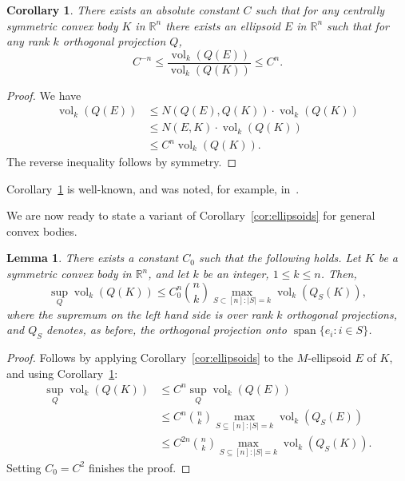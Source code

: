 \documentclass{article}
\newtheorem{lemma}{Lemma}
\newtheorem{corollary}[theorem]{Corollary}
\newcommand{\R}{{\mathbb{R}}}
\DeclareMathOperator{\vol}{vol}
\DeclareMathOperator{\lspan}{span}
\begin{document}
\begin{corollary}\label{cor:M-ellips}
  There exists an absolute constant $C$ such that for any centrally
  symmetric convex body $K$ in $\R^n$ there exists an ellipsoid $E$ in
  $\R^n$ such that for any rank $k$ orthogonal projection $Q$, 
  \[
  C^{-n} \le \frac{\vol_k(Q(E))}{\vol_k(Q(K))} \le C^n.
  \]
\end{corollary}
\begin{proof}
  We have
  \begin{align*}
    \vol_k(Q(E)) &\le N(Q(E), Q(K)) \cdot \vol_k(Q(K))\\
    &\le N(E, K) \cdot \vol_k(Q(K))\\
    &\le C^n \vol_k(Q(K)).
  \end{align*}
  The reverse inequality follows by symmetry. 
\end{proof}

Corollary~\ref{cor:M-ellips} is well-known, and was noted, for
example, in~\cite{MTJ03}.

We are now ready to state a variant of Corollary~\ref{cor:ellipsoids}
for general convex bodies. 

\begin{lemma}\label{lm:coordproj}
  There exists a constant $C_0$ such that the following holds. Let $K$
  be a symmetric convex body in $\R^n$, and let $k$ be an integer, $1
  \le k \le n$. Then,
  \[
  \sup_Q \vol_k(Q(K)) \le 
  C_0^n {n \choose k} 
  \max_{S \subset [n]: |S|  = k} \vol_k(Q_S(K)),
  \]
  where the supremum on the left hand side is over rank $k$ orthogonal
  projections, and $Q_S$ denotes, as before, the orthogonal projection
  onto $\lspan\{e_i: i \in S\}$. 
\end{lemma}
\begin{proof}
  Follows by applying Corollary~\ref{cor:ellipsoids} to the
  $M$-ellipsoid $E$ of $K$, and using Corollary~\ref{cor:M-ellips}:
  \begin{align*}
    \sup_Q \vol_k(Q(K)) &\le C^n \sup_Q \vol_k(Q(E))\\
    &\le C^n {n \choose k} \max_{S \subseteq [n]: |S| = k}
    \vol_k(Q_S(E))\\
    &\le C^{2n} {n \choose k} \max_{S \subseteq [n]: |S| = k}
    \vol_k(Q_S(K)).
  \end{align*}
  Setting $C_0 = C^2$ finishes the proof. 
\end{proof}
\end{document}
